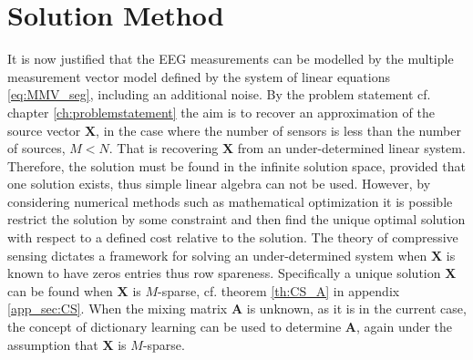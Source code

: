 \section{Solution Method}\label{sec:sol_met}
It is now justified that the EEG measurements can be modelled by the multiple measurement vector model defined by the system of linear equations \eqref{eq:MMV_seg}, including an additional noise.
By the problem statement cf. chapter \ref{ch:problemstatement} the aim is to recover an approximation of the source vector $\mathbf{X}$, in the case where the number of sensors is less than the number of sources, $M < N$. That is recovering $\mathbf{X}$ from an under-determined linear system. Therefore, the solution must be found in the infinite solution space, provided that one solution exists, thus simple linear algebra can not be used. 
However, by considering numerical methods such as mathematical optimization it is possible restrict the solution by some constraint and then find the unique optimal solution with respect to a defined cost relative to the solution.
The theory of compressive sensing dictates a framework for solving an under-determined system when $\mathbf{X}$ is known to have zeros entries thus row spareness. Specifically a unique solution $\mathbf{X}$ can be found when $\mathbf{X}$ is $M$-sparse, cf. theorem \ref{th:CS_A} in appendix \ref{app_sec:CS}. When the mixing matrix $\mathbf{A}$ is unknown, as it is in the current case, the concept of dictionary learning can be used to determine $\mathbf{A}$, again under the assumption that $\mathbf{X}$ is $M$-sparse.  

